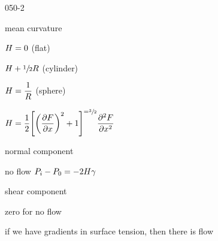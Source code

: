 \begin{mitframe}{050-2}
\begin{listtwo}
\begin{listthree}
                    		\begin{listfour}
                            \item mean curvature
                            		\begin{listfive}
                                    	\item $\enthalpy=0$ (flat)
                                        \item $\enthalpy+\sfrac{1}{2}\gasconst$ (cylinder)
                                        \item $\enthalpy=\dfrac{1}{\gasconst}$ (sphere)
                                        \item $\enthalpy=\dfrac{1}{2}\Bigg[\bigg(\dfrac{\partial\force}{\partial\disp}\bigg)^2+1\Bigg]^{=\sfrac{3}{2}}\dfrac{\partial^2\force}{\partial\disp^2}$
                                    \end{listfive}
                            \end{listfour}
                      \end{listthree}
    \item normal component
    	\begin{listthree}
        	\item no flow $\p_{\state}-\p_{0}=-2\enthalpy\gamma$
        \end{listthree}
    \item shear component
    	\begin{listthree}
        	\item zero for no flow
            \item if we have gradients in surface tension, then there is flow
        \end{listthree}
\end{listtwo}        
\end{mitframe}